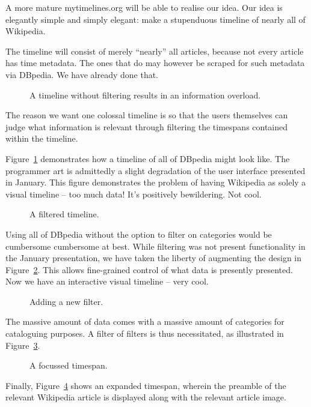 A more mature mytimelines.org will be able to realise our idea. Our idea is 
elegantly simple and simply elegant: make a stupenduous timeline of nearly all 
of Wikipedia.

The timeline will consist of merely ``nearly'' all articles, because not every 
article has time metadata. The ones that do may however be scraped for such 
metadata via DBpedia. We have already done that.

\begin{figure}[H]
  \centering
  \begin{scale}{0.3}
    
  \end{scale}
  \caption{A timeline without filtering results in an information overload.}
  \label{fig:overload}
\end{figure}

The reason we want one colossal timeline is so that the users themselves can 
judge what information is relevant through filtering the timespans contained 
within the timeline.

Figure~\ref{fig:overload} demonstrates how a timeline of all of DBpedia might 
look like. The programmer art is admittedly a slight degradation of the user 
interface presented in January. This figure demonstrates the problem of having 
Wikipedia as solely a visual timeline -- too much data! It's positively 
bewildering. Not cool.

\begin{figure}[H]
  \centering
  \begin{scale}{0.3}
    
  \end{scale}
  \caption{A filtered timeline.}
  \label{fig:filtered}
\end{figure}

Using all of DBpedia without the option to filter on categories would be 
cumbersome cumbersome at best. While filtering was not present functionality 
in the January presentation, we have taken the liberty of augmenting the 
design in Figure~\ref{fig:filtered}. This allows fine-grained control of what 
data is presently presented. Now we have an interactive visual timeline -- 
very cool.

\begin{figure}[H]
  \centering
  \begin{scale}{0.5}
    
  \end{scale}
  \caption{Adding a new filter.}
  \label{fig:filters}
\end{figure}

The massive amount of data comes with a massive amount of categories for 
cataloguing purposes. A filter of filters is thus necessitated, as illustrated 
in Figure~\ref{fig:filters}.

\begin{figure}[H]
  \centering
  \begin{scale}{0.3}
    
  \end{scale}
  \caption{A focussed timespan.}
  \label{fig:focussed}
\end{figure}

Finally, Figure~\ref{fig:focussed} shows an expanded timespan, wherein the 
preamble of the relevant Wikipedia article is displayed along with the 
relevant article image.
